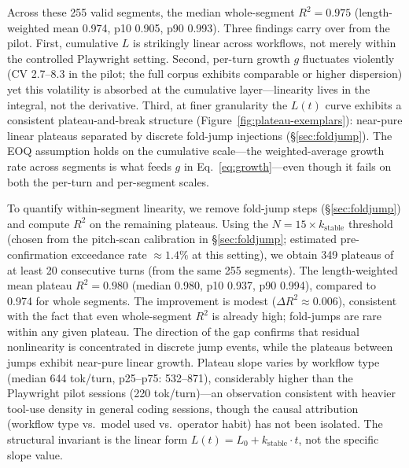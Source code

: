 \documentclass[11pt]{article}
\theoremstyle{definition}
\theoremstyle{remark}
\begin{document}
Across these 255 valid segments, the median whole-segment $R^2 = 0.975$ (length-weighted mean 0.974, p10 0.905, p90 0.993). Three findings carry over from the pilot. First, cumulative $L$ is strikingly linear across workflows, not merely within the controlled Playwright setting. Second, per-turn growth $g$ fluctuates violently (CV 2.7--8.3 in the pilot; the full corpus exhibits comparable or higher dispersion) yet this volatility is absorbed at the cumulative layer---linearity lives in the integral, not the derivative. Third, at finer granularity the $L(t)$ curve exhibits a consistent plateau-and-break structure (Figure~\ref{fig:plateau-exemplars}): near-pure linear plateaus separated by discrete fold-jump injections (\S\ref{sec:foldjump}). The EOQ assumption holds on the cumulative scale---the weighted-average growth rate across segments is what feeds $g$ in Eq.~\ref{eq:growth}---even though it fails on both the per-turn and per-segment scales.

To quantify within-segment linearity, we remove fold-jump steps (\S\ref{sec:foldjump}) and compute $R^2$ on the remaining plateaus. Using the $N=15\times k_{\text{stable}}$ threshold (chosen from the pitch-scan calibration in \S\ref{sec:foldjump}; estimated pre-confirmation exceedance rate $\approx 1.4\%$ at this setting), we obtain 349 plateaus of at least 20 consecutive turns (from the same 255 segments). The length-weighted mean plateau $R^2 = 0.980$ (median 0.980, p10 0.937, p90 0.994), compared to 0.974 for whole segments. The improvement is modest ($\Delta R^2 \approx 0.006$), consistent with the fact that even whole-segment $R^2$ is already high; fold-jumps are rare within any given plateau. The direction of the gap confirms that residual nonlinearity is concentrated in discrete jump events, while the plateaus between jumps exhibit near-pure linear growth. Plateau slope varies by workflow type (median 644 tok/turn, p25--p75: 532--871), considerably higher than the Playwright pilot sessions (220 tok/turn)---an observation consistent with heavier tool-use density in general coding sessions, though the causal attribution (workflow type vs.\ model used vs.\ operator habit) has not been isolated. The structural invariant is the linear form $L(t) = L_0 + k_{\text{stable}} \cdot t$, not the specific slope value.
\end{document}
